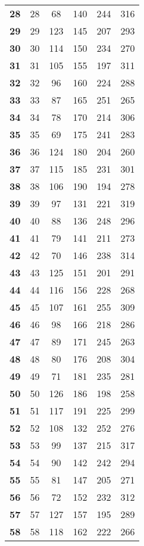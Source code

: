 \begin{longtable}{|r|c|c|c|c|c|}
    \textbf{28} & 28 &68 & 140 & 244 & 316 \\
    \textbf{29} & 29 &123 & 145 & 207 & 293 \\
    \textbf{30} & 30 &114 & 150 & 234 & 270 \\
    \textbf{31} & 31 &105 & 155 & 197 & 311 \\
    \textbf{32} & 32 &96 & 160 & 224 & 288 \\
    \textbf{33} & 33 &87 & 165 & 251 & 265 \\
    \textbf{34} & 34 &78 & 170 & 214 & 306 \\
    \textbf{35} & 35 &69 & 175 & 241 & 283 \\
    \textbf{36} & 36 &124 & 180 & 204 & 260 \\
    \textbf{37} & 37 &115 & 185 & 231 & 301 \\
    \textbf{38} & 38 &106 & 190 & 194 & 278 \\
    \textbf{39} & 39 &97 & 131 & 221 & 319 \\
    \textbf{40} & 40 &88 & 136 & 248 & 296 \\
    \textbf{41} & 41 &79 & 141 & 211 & 273 \\
    \textbf{42} & 42 &70 & 146 & 238 & 314 \\
    \textbf{43} & 43 &125 & 151 & 201 & 291 \\
    \textbf{44} & 44 &116 & 156 & 228 & 268 \\
    \textbf{45} & 45 &107 & 161 & 255 & 309 \\
    \textbf{46} & 46 &98 & 166 & 218 & 286 \\
    \textbf{47} & 47 &89 & 171 & 245 & 263 \\
    \textbf{48} & 48 &80 & 176 & 208 & 304 \\
    \textbf{49} & 49 &71 & 181 & 235 & 281 \\
    \textbf{50} & 50 &126 & 186 & 198 & 258 \\
    \textbf{51} & 51 &117 & 191 & 225 & 299 \\
    \textbf{52} & 52 &108 & 132 & 252 & 276 \\
    \textbf{53} & 53 &99 & 137 & 215 & 317 \\
    \textbf{54} & 54 &90 & 142 & 242 & 294 \\
    \textbf{55} & 55 &81 & 147 & 205 & 271 \\
    \textbf{56} & 56 &72 & 152 & 232 & 312 \\
    \textbf{57} & 57 &127 & 157 & 195 & 289 \\
    \textbf{58} & 58 &118 & 162 & 222 & 266 \\

\end{longtable}
